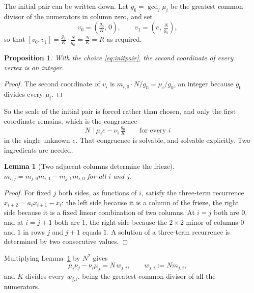 \documentclass[11pt]{article}
\theoremstyle{plain}
\newtheorem{proposition}[theorem]{Proposition}
\newtheorem{lemma}[theorem]{Lemma}
\theoremstyle{definition}
\begin{document}
The initial pair can be written down. Let $g_0=\gcd_i\mu_i$ be the greatest common divisor
of the numerators in column zero, and set
\begin{equation}\label{eq:initpair}
  v_0=\left(\tfrac{g_0}{K},\,0\right),\qquad v_1=\left(e,\,\tfrac{N}{g_0}\right),
\end{equation}
so that $[v_0,v_1]=\tfrac{g_0}{K}\cdot\tfrac{N}{g_0}=\tfrac NK=R$ as required.

\begin{proposition}\label{prop:secondcoord}
With the choice \eqref{eq:initpair}, the second coordinate of every vertex is an integer.
\end{proposition}

\begin{proof}
The second coordinate of $v_i$ is $m_{i,0}\cdot N/g_0=\mu_i/g_0$, an integer because $g_0$
divides every $\mu_i$.
\end{proof}

So the scale of the initial pair is forced rather than chosen, and only the first coordinate
remains, which is the congruence
\begin{equation}\label{eq:econg}
  N \mid \mu_i e-\nu_i\,\tfrac{g_0}{K}\qquad\text{for every } i
\end{equation}
in the single unknown $e$. That congruence is solvable, and solvable explicitly. Two
ingredients are needed.

\begin{lemma}[Two adjacent columns determine the frieze]\label{lem:twocol}
$m_{i,j}=m_{j,0}m_{i,1}-m_{j,1}m_{i,0}$ for all $i$ and $j$.
\end{lemma}

\begin{proof}
For fixed $j$ both sides, as functions of $i$, satisfy the three-term recurrence
$x_{i+2}=a_ix_{i+1}-x_i$: the left side because it is a column of the frieze, the right side
because it is a fixed linear combination of two columns. At $i=j$ both are $0$, and at
$i=j+1$ both are $1$, the right side because the $2\times2$ minor of columns $0$ and $1$ in
rows $j$ and $j+1$ equals $1$. A solution of a three-term recurrence is determined by two
consecutive values.
\end{proof}

Multiplying Lemma~\ref{lem:twocol} by $N^2$ gives
\begin{equation}\label{eq:twocolnum}
  \mu_i\nu_j-\nu_i\mu_j=N\,w_{j,i},\qquad w_{j,i}:=Nm_{j,i},
\end{equation}
and $K$ divides every $w_{j,i}$, being the greatest common divisor of all the numerators.
\end{document}
